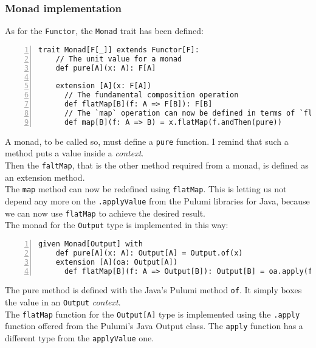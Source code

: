 \subsubsection{Monad implementation}
As for the \texttt{Functor}, the \texttt{Monad} trait has been defined:\\
\begin{minipage}{\linewidth}
\begin{lstlisting}[numbers=left, numberstyle=\tiny, numbersep=-5pt, stepnumber=1, linewidth=420pt]
  trait Monad[F[_]] extends Functor[F]:
    // The unit value for a monad
    def pure[A](x: A): F[A]

    extension [A](x: F[A])
      // The fundamental composition operation
      def flatMap[B](f: A => F[B]): F[B]
      // The `map` operation can now be defined in terms of `flatMap`
      def map[B](f: A => B) = x.flatMap(f.andThen(pure))
\end{lstlisting}
\end{minipage}
A monad, to be called so, must define a \texttt{pure} function.
I remind that such a method puts a value inside a \textit{context}.\\
Then the \texttt{faltMap}, that is the other method required from a monad, is defined as an extension method.\\
The \texttt{map} method can now be redefined using \texttt{flatMap}.
This is letting us not depend any more on the \texttt{.applyValue} from the Pulumi libraries for Java, because we can now use \texttt{flatMap} to achieve the desired result.\\
The monad for the \texttt{Output} type is implemented in this way:\\
\begin{minipage}{\linewidth}
\begin{lstlisting}[numbers=left, numberstyle=\tiny, numbersep=-5pt, stepnumber=1, linewidth=420pt]
  given Monad[Output] with
    def pure[A](x: A): Output[A] = Output.of(x)
    extension [A](oa: Output[A])
      def flatMap[B](f: A => Output[B]): Output[B] = oa.apply(f.asJava)
\end{lstlisting}
\end{minipage}
The pure method is defined with the Java's Pulumi method \texttt{of}.
It simply boxes the value in an \texttt{Output} \textit{context}.\\
The \texttt{flatMap} function for the \texttt{Output[A]} type is implemented using the \texttt{.apply} function offered from the Pulumi's Java Output class.
The \texttt{apply} function has a different type from the \texttt{applyValue} one.
